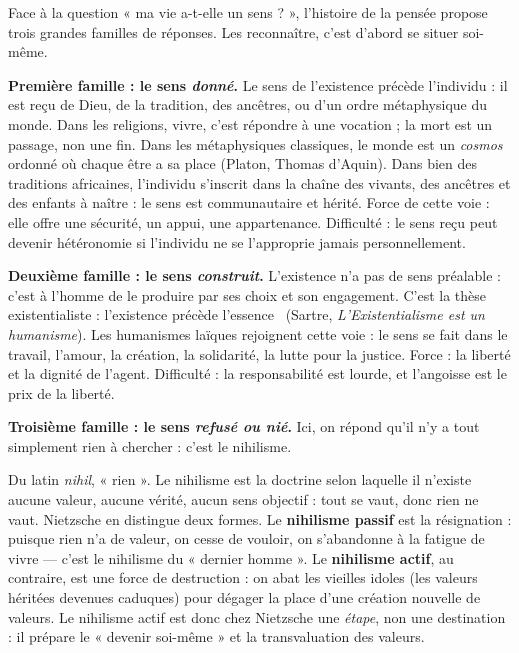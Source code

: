 \documentclass[11pt]{article}
\newcommand{\cle}[1]{{\popxbold\color{popdark}#1}}
\begin{document}
Face à la question « ma vie a-t-elle un sens ? », l'histoire de la pensée propose trois grandes familles de réponses. Les reconnaître, c'est d'abord se situer soi-même.

\textbf{Première famille : le sens \emph{donné}.} Le sens de l'existence précède l'individu : il est reçu de Dieu, de la tradition, des ancêtres, ou d'un ordre métaphysique du monde. Dans les religions, vivre, c'est répondre à une vocation ; la mort est un passage, non une fin. Dans les métaphysiques classiques, le monde est un \emph{cosmos} ordonné où chaque être a sa place (Platon, Thomas d'Aquin). Dans bien des traditions africaines, l'individu s'inscrit dans la chaîne des vivants, des ancêtres et des enfants à naître : le sens est communautaire et hérité. Force de cette voie : elle offre une sécurité, un appui, une appartenance. Difficulté : le sens reçu peut devenir hétéronomie si l'individu ne se l'approprie jamais personnellement.

\textbf{Deuxième famille : le sens \emph{construit}.} L'existence n'a pas de sens préalable : c'est à l'homme de le produire par ses choix et son engagement. C'est la thèse existentialiste : \guillemotleft l'existence précède l'essence \guillemotright\ (Sartre, \emph{L'Existentialisme est un humanisme}). Les humanismes laïques rejoignent cette voie : le sens se fait dans le travail, l'amour, la création, la solidarité, la lutte pour la justice. Force : la liberté et la dignité de l'agent. Difficulté : la responsabilité est lourde, et l'angoisse est le prix de la liberté.

\textbf{Troisième famille : le sens \emph{refusé ou nié}.} Ici, on répond qu'il n'y a tout simplement rien à chercher : c'est le \cle{nihilisme}.

\begin{definition}
Du latin \emph{nihil}, « rien ». Le \cle{nihilisme} est la doctrine selon laquelle il n'existe aucune valeur, aucune vérité, aucun sens objectif : tout se vaut, donc rien ne vaut. Nietzsche en distingue deux formes. Le \textbf{nihilisme passif} est la résignation : puisque rien n'a de valeur, on cesse de vouloir, on s'abandonne à la fatigue de vivre — c'est le nihilisme du « dernier homme ». Le \textbf{nihilisme actif}, au contraire, est une force de destruction : on abat les vieilles idoles (les valeurs héritées devenues caduques) pour dégager la place d'une création nouvelle de valeurs. Le nihilisme actif est donc chez Nietzsche une \emph{étape}, non une destination : il prépare le « devenir soi-même » et la transvaluation des valeurs.
\end{definition}
\end{document}
